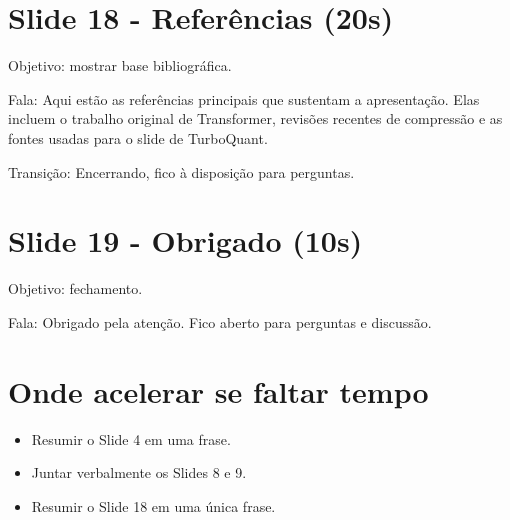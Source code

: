 \section{Slide 18 - Referências (20s)}


Objetivo: mostrar base bibliográfica.





Fala: Aqui estão as referências principais que sustentam a apresentação. Elas incluem o trabalho original de Transformer, revisões recentes de compressão e as fontes usadas para o slide de TurboQuant.




Transição: Encerrando, fico à disposição para perguntas.



\section{Slide 19 - Obrigado (10s)}


Objetivo: fechamento.





Fala: Obrigado pela atenção. Fico aberto para perguntas e discussão.



\section{Onde acelerar se faltar tempo}


\begin{itemize}
\item Resumir o Slide 4 em uma frase.
\item Juntar verbalmente os Slides 8 e 9.
\item Resumir o Slide 18 em uma única frase.
\end{itemize}
